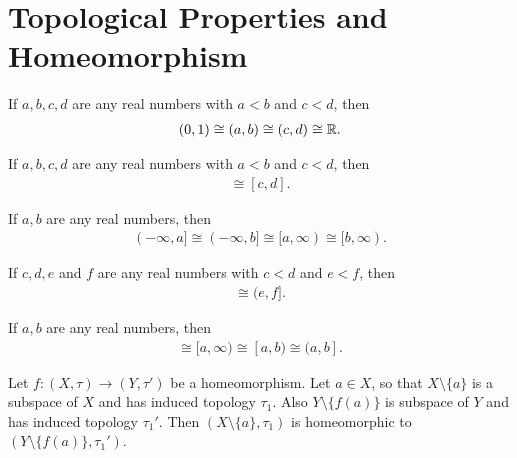 \chapter{Topological Properties and Homeomorphism}\label{chp:2_6}

\begin{proposition}{}{}
    If $a,b,c,d$ are any real numbers with $a<b$ and $c<d$, then
    \begin{align*}
        (0,1)\cong (a,b)\cong (c,d)\cong \mathbb{R}.
    \end{align*}
\end{proposition}

\begin{proposition}{}{}
    If $a,b,c,d$ are any real numbers with $a<b$ and $c<d$, then
    \begin{align*}
        [a,b]\cong [c,d].
    \end{align*}
\end{proposition}

\begin{proposition}{}{}
    If $a,b$ are any real numbers, then 
    \begin{align*}
        (-\infty,a]\cong (-\infty, b] \cong [a,\infty) \cong [b,\infty).
    \end{align*}
\end{proposition}

\begin{proposition}{}{}
    If $c,d,e$ and $f$ are any real numbers with $c<d$ and $e<f$, then 
    \begin{align*}
        [c,d)\cong [e,f)\cong (c,d]\cong (e,f].
    \end{align*}
\end{proposition}

\begin{proposition}{}{}
    If $a,b$ are any real numbers, then 
    \begin{align*}
        [0,1)\cong (-\infty,a]\cong  [a,\infty) \cong [a,b)\cong (a,b].
    \end{align*}
\end{proposition}


\begin{proposition}{}{}
    Let $f:(X,\tau)\rightarrow (Y,\tau')$ be a homeomorphism. Let $a\in X$, 
    so that $X\setminus\{a\}$ is a subspace of $X$ and has induced topology $\tau_1$.
    Also $Y\setminus \{f(a)\}$ is subspace of $Y$ and has induced topology $\tau_1'$. 
    Then $(X\setminus \{a\},\tau_1)$ is homeomorphic to $(Y\setminus \{f(a)\},\tau_1')$.
\end{proposition}



